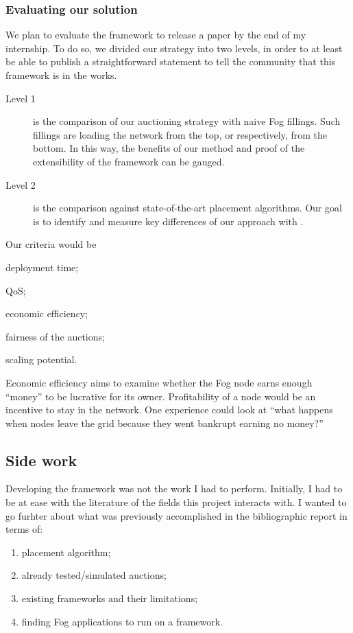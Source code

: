 \subsubsection{Evaluating our solution}

We plan to evaluate the framework to release a paper by the end of my internship. To do so, we divided our strategy into two levels, in order to at least be able to publish a straightforward statement to tell the community that this framework is in the works.

\begin{description}
	\item[Level 1]{is the comparison of our auctioning strategy with naive Fog fillings. Such fillings are loading the network from the top, or respectively, from the bottom. In this way, the benefits of our method and proof of the extensibility of the framework can be gauged.}
	\item[Level 2]{is the comparison against state-of-the-art placement algorithms. Our goal is to identify and measure key differences of our approach with \cite{tasiopoulos_fogspot_2019, bermbach_auctionwhisk_2021}.}
\end{description}

Our criteria would be
\begin{enumerate*}[(1)]
	\item deployment time;
	\item \gls{QoS};
	\item economic efficiency;
	\item fairness of the auctions;
	\item scaling potential.
\end{enumerate*}

Economic efficiency aims to examine whether the Fog node earns enough “money” to be lucrative for its owner. Profitability of a node would be an incentive to stay in the network. One experience could look at “what happens when nodes leave the grid because they went bankrupt earning no money?”

\subsection{Side work}

Developing the framework was not the work I had to perform. Initially, I had to be at ease with the literature of the fields this project interacts with. I wanted to go furhter about what was previously accomplished in the bibliographic report in terms of:
\begin{enumerate}
	\item placement algorithm;\label{enumerate:placement}
	\item already tested/simulated auctions;\label{enumerate:alreadytested}
	\item existing frameworks and their limitations;\label{enumerate:frameworklimitations}
	\item finding Fog applications to run on a framework.\label{enumerate:fogapplications}
\end{enumerate}


